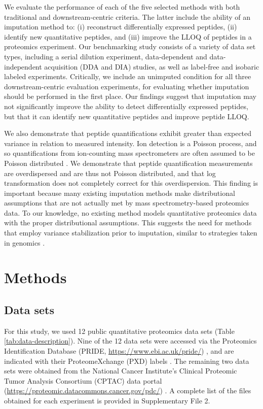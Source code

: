 \documentclass{article}
\begin{document}
We evaluate the performance of each of the five selected methods with both traditional and downstream-centric criteria. The latter include the ability of an imputation method to: (i) reconstruct differentially expressed peptides, (ii) identify new quantitative peptides, and (iii) improve the LLOQ of peptides in a proteomics experiment. Our benchmarking study consists of a variety of data set types, including a serial dilution experiment, data-dependent and data-independent acquisition (DDA and DIA) studies, as well as label-free and isobaric labeled experiments. Critically, we include an unimputed condition for all three downstream-centric evaluation experiments, for evaluating whether imputation should be performed in the first place. Our findings suggest that imputation may not significantly improve the ability to detect differentially expressed peptides, but that it can identify new quantitative peptides and improve peptide LLOQ.

We also demonstrate that peptide quantifications exhibit greater than expected variance in relation to measured intensity. Ion detection is a Poisson process, and so quantifications from ion-counting mass spectrometers are often assumed to be Poisson distributed \cite{ms-dist-derivation, stat-theory-lcms}. We demonstrate that peptide quantification measurements are overdispersed and are thus not Poisson distributed, and that log transformation does not completely correct for this overdispersion. This finding is important because many existing imputation methods make distributional assumptions that are not actually met by mass spectrometry-based proteomics data. To our knowledge, no existing method models quantitative proteomics data with the proper distributional assumptions. This suggests the need for methods that employ variance stabilization prior to imputation, similar to strategies taken in genomics \cite{variance-stable, ZINB, neg-binom-scRNAseq}.

\section{Methods}

\subsection{Data sets}

For this study, we used 12 public quantitative proteomics data sets (Table \ref{tab:data-description}). Nine of the 12 data sets were accessed via the Proteomics Identification Database (PRIDE, \url{https://www.ebi.ac.uk/pride/}) \cite{PRIDE}, and are indicated with their ProteomeXchange (PXD) labels \cite{ProteomeXchange}. The remaining two data sets were obtained from the National Cancer Institute's Clinical Proteomic Tumor Analysis Consortium (CPTAC) data portal (\url{https://proteomic.datacommons.cancer.gov/pdc/}) \cite{CPTAC}. A complete list of the files obtained for each experiment is provided in Supplementary File 2. 
\end{document}
